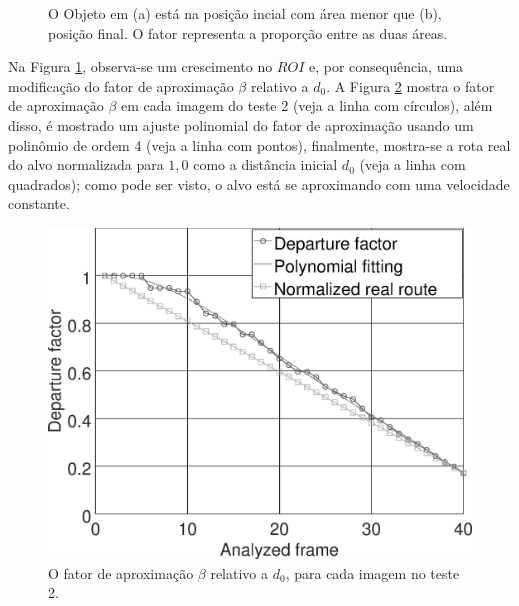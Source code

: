 \begin{figure}[H]
\centering
  \caption{O Objeto em (a) está na posição incial com área menor que (b), 
  posição final. O fator representa a proporção entre as duas áreas.}
  \label{fig:target}
\end{figure}

Na Figura \ref{fig:target}, observa-se um crescimento no $ROI$ e, por
consequência, uma modificação do fator de aproximação $\beta$ relativo a $d_0$.
A Figura \ref{fig:res_grapha_b} mostra o fator de aproximação $\beta$ em cada imagem 
do teste 2 (veja a linha com círculos),
além disso, é mostrado um ajuste polinomial do fator de aproximação usando 
um polinômio de ordem 4 (veja a linha com pontos),
finalmente, mostra-se a rota real do alvo normalizada para $1,0$ como a 
distância inicial $d_0$ (veja a linha com quadrados);
como pode ser visto, o alvo está se aproximando com uma velocidade constante.
\begin{figure}[H]
\includegraphics[width=\columnwidth]{images/grapha_b.eps}
\caption{O fator de aproximação $\beta$ relativo a $d_0$, para cada imagem no teste 2.}
\label{fig:res_grapha_b}
\end{figure}



